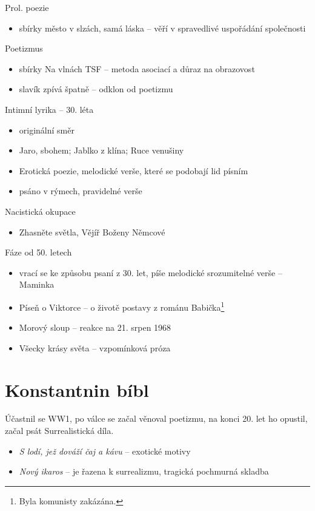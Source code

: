 \documentclass[10pt,a4page,headings,openany,%
oneside
,twocolumn
]{report}
\begin{document}
\textsf{Prol. poezie}
\begin{itemize}
\item sbírky město v slzách, samá láska -- věří v spravedlivé uspořádání společnosti
\end{itemize}
\textsf{Poetizmus}
\begin{itemize}
\item sbírky Na vlnách TSF -- metoda asociací a důraz na obrazovost
\item slavík zpívá špatně -- odklon od poetizmu
\end{itemize}	
\vspace{2cm}
\textsf{Intimní lyrika} -- 30. léta
\begin{itemize}
\item originální směr
\item Jaro, sbohem;  Jablko z klína; Ruce venušiny
\item Erotická poezie, melodické verše, které se podobají lid písním 
\item psáno v rýmech, pravidelné verše

\end{itemize}

\textsf{Nacistická okupace}
\begin{itemize}
\item Zhasněte světla, Vějíř Boženy Němcové
\end{itemize}

\textsf{Fáze od 50. letech}
\begin{itemize}
\item vrací se ke způsobu psaní z 30. let, píše melodické srozumitelné verše -- Maminka
\item Píseň o Viktorce -- o životě postavy z románu Babička\footnote{Byla komunisty zakázána.}
\item Morový sloup -- reakce na 21. srpen 1968
\item Všecky krásy světa -- vzpomínková próza
\end{itemize}

\section{Konstantnin bíbl}
Účastnil se WW1, po válce se začal věnoval poetizmu, na konci 20. let ho opustil, začal psát Surrealistická díla.

\begin{itemize}
\item \emph{S lodí, jež dováží čaj a kávu} -- exotické motivy
\item \emph{Nový ikaros} -- je řazena k surrealizmu, tragická pochmurná skladba
\end{itemize}
\end{document}
